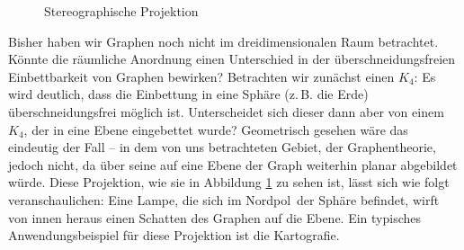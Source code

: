 \begin{figure}
\caption{Stereographische Projektion}
\label{stP}
\end{figure}
Bisher haben wir Graphen noch nicht im dreidimensionalen Raum betrachtet. Könnte die räumliche Anordnung einen Unterschied in der überschneidungsfreien Einbettbarkeit von Graphen bewirken?  Betrachten wir zunächst einen $K_4$: Es wird deutlich, dass die Einbettung in eine Sphäre (z.\,B. die Erde) überschneidungsfrei möglich ist. Unterscheidet sich dieser dann aber von einem $K_4$, der in eine Ebene eingebettet wurde? Geometrisch gesehen wäre das eindeutig der Fall -- in dem von uns betrachteten Gebiet, der Graphentheorie, jedoch nicht, da über seine  auf eine Ebene der Graph weiterhin planar abgebildet würde.
Diese Projektion, wie sie in Abbildung \ref{stP} zu sehen ist, lässt sich wie folgt veranschaulichen: Eine Lampe, die sich im \glqq Nordpol\grqq\ der Sphäre befindet, wirft von innen heraus einen Schatten des Graphen auf die Ebene. Ein typisches Anwendungsbeispiel für diese Projektion ist die Kartografie. 



